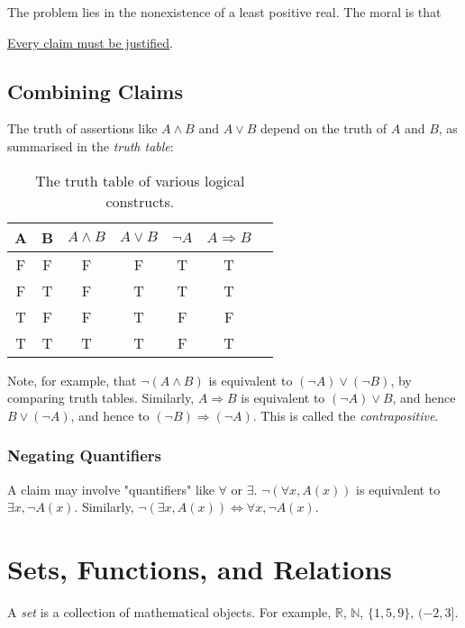 \documentclass[12pt]{article}
\begin{document}
The problem lies in the nonexistence of a least positive real.
The moral is that
\begin{center}
    \underline{Every claim must be justified}.
\end{center}

\subsection{Combining Claims}

The truth of assertions like $A \land B$ and $A \lor B$ depend on
the truth of $A$ and $B$, as summarised in the \emph{truth table}:

\begin{table}[h]
    \centering
    \begin{tabular}{ |c|c|c|c|c|c|c| }
        \hline
        A & B & $A \land B$ & $A \lor B$ & $\neg A$ & $A \Rightarrow B$ \\
        \hline
        F & F & F & F & T & T\\
        F & T & F & T & T & T\\
        T & F & F & T & F & F\\
        T & T & T & T & F & T\\
        \hline
    \end{tabular}
    \caption{The truth table of various logical constructs.}
\end{table}

Note, for example, that $\neg (A \land B)$ is equivalent to
$(\neg A) \lor (\neg B)$, by comparing truth tables.
Similarly, $A \Rightarrow B$ is equivalent to $(\neg A) \lor B$,
and hence $B \lor (\neg A)$,
and hence to $(\neg B) \Rightarrow (\neg A)$.
This is called the \emph{contrapositive}.

\subsubsection*{Negating Quantifiers}

A claim may involve "quantifiers" like $\forall$ or $\exists$.
$\neg(\forall x, A(x))$ is equivalent to $\exists x, \neg A(x)$.
Similarly, $\neg(\exists x, A(x)) \iff \forall x, \neg A(x)$.

\section{Sets, Functions, and Relations}

A \emph{set} is a collection of mathematical objects.
For example, $\mathbb{R}$, $\mathbb{N}$, $\{1,5,9\}$, $(-2,3]$.
\end{document}
